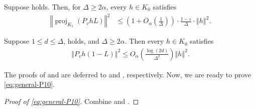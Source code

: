 \documentclass[a4paper,12pt]{article}
\theoremstyle{plain}
\theoremstyle{definition}
\def\*#1{\mathbf{#1}} %
\def\-#1{\mathrm{#1}} %
\def\!#1{\mathfrak{#1}} %
\def\*#1{\boldsymbol{#1}} %
\def\-#1{\mathrm{#1}} %
\def\!#1{\mathfrak{#1}} %
\renewcommand{\epsilon}{\varepsilon}
\newcommand{\norm}[1]{\left\Vert#1\right\Vert}
\newcommand{\tuple}[1]{\left(#1\right)}
\newcommand{\tp}{\tuple}
\begin{document}
\begin{proposition}\label{cor:related-to-contraction}
Suppose  holds.
Then, for $\Delta\geq2\alpha$,
every $h\in K_0$ satisfies
\begin{align}
  \norm{\operatorname{proj}_{K_1}(P_vhL)}^2
  &\leq
  \tp{1+O_{\alpha}\tp{\frac1\Delta}}
  \cdot \frac{1-\epsilon}{\Delta}\cdot 
  \norm{h}^2.
  \label{eq:row-bounded-B-bound}
\end{align}
\end{proposition}

\begin{proposition}\label{prop:row-bounded-normalizer}
  Suppose $1\leq d\leq\Delta$,
   holds, and
  $\Delta\geq2\alpha$.  Then every $h\in K_0$ satisfies
\begin{align}
  \norm{P_vh(1-L)}^2
  \leq
  O_{\alpha}\tp{
    \frac{\log(2d)}{\Delta^2}
  }
  \norm{h}^2.
  \label{eq:row-bounded-normalizer-bound}
\end{align}
\end{proposition}
The proofs of  and  are deferred to
 and , respectively.
%
Now, we are ready to prove \eqref{eq:general-P10}.

\begin{proof}[Proof of \eqref{eq:general-P10}]
  Combine  and .
\end{proof}
\end{document}
